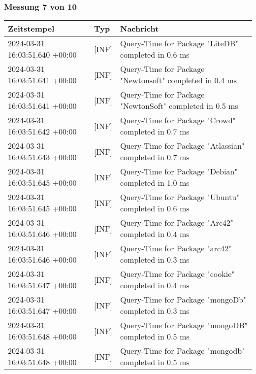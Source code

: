     \subsubsection*{Messung 7 von 10} \label{subsubsec:MySQLMitIndex7von10}
        {
            {\small
                \begin{tabularx}{\textwidth}{|l|l|X|}
                    \hline
                    \textbf{Zeitstempel} & \textbf{Typ} & \textbf{Nachricht} \\
                    \hline
                    \endhead
                    2024-03-31 16:03:51.640 +00:00 & [INF] & Query-Time for Package "LiteDB" completed in 0.6 ms \\
                    2024-03-31 16:03:51.641 +00:00 & [INF] & Query-Time for Package "Newtonsoft" completed in 0.4 ms \\
                    2024-03-31 16:03:51.641 +00:00 & [INF] & Query-Time for Package "NewtonSoft" completed in 0.5 ms \\
                    2024-03-31 16:03:51.642 +00:00 & [INF] & Query-Time for Package "Crowd" completed in 0.7 ms \\
                    2024-03-31 16:03:51.643 +00:00 & [INF] & Query-Time for Package "Atlassian" completed in 0.7 ms \\
                    2024-03-31 16:03:51.645 +00:00 & [INF] & Query-Time for Package "Debian" completed in 1.0 ms \\
                    2024-03-31 16:03:51.645 +00:00 & [INF] & Query-Time for Package "Ubuntu" completed in 0.6 ms \\
                    2024-03-31 16:03:51.646 +00:00 & [INF] & Query-Time for Package "Arc42" completed in 0.4 ms \\
                    2024-03-31 16:03:51.646 +00:00 & [INF] & Query-Time for Package "arc42" completed in 0.3 ms \\
                    2024-03-31 16:03:51.647 +00:00 & [INF] & Query-Time for Package "cookie" completed in 0.4 ms \\
                    2024-03-31 16:03:51.647 +00:00 & [INF] & Query-Time for Package "mongoDb" completed in 0.3 ms \\
                    2024-03-31 16:03:51.648 +00:00 & [INF] & Query-Time for Package "mongoDB" completed in 0.5 ms \\
                    2024-03-31 16:03:51.648 +00:00 & [INF] & Query-Time for Package "mongodb" completed in 0.5 ms \\

\end{tabularx}}}
